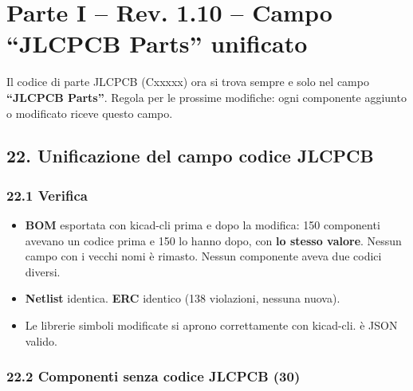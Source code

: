 \clearpage
\section[Parte I – Rev. 1.10 – Campo \textquotedblleft{}JLCPCB Parts\textquotedblright{} unificato]{Parte I – Rev. 1.10 – Campo \textquotedblleft{}JLCPCB Parts\textquotedblright{} unificato}

Il codice di parte JLCPCB (Cxxxxx) ora si trova sempre e solo nel campo \textbf{\textquotedblleft{}JLCPCB Parts\textquotedblright{}}. Regola per le prossime modifiche: ogni componente aggiunto o modificato riceve questo campo.

\subsection[22. Unificazione del campo codice JLCPCB]{22. Unificazione del campo codice JLCPCB }

\subsubsection[22.1 Verifica]{22.1 Verifica}

\begin{itemize}
\item \textbf{BOM} esportata con kicad-cli prima e dopo la modifica: 150 componenti avevano un codice prima e 150 lo hanno dopo, con \textbf{lo stesso valore}. Nessun campo con i vecchi nomi è rimasto. Nessun componente aveva due codici diversi.
\item \textbf{Netlist} identica. \textbf{ERC} identico (138 violazioni, nessuna nuova).
\item Le librerie simboli modificate si aprono correttamente con kicad-cli.  è JSON valido.
\end{itemize}

\subsubsection[22.2 Componenti senza codice JLCPCB (30)]{22.2 Componenti senza codice JLCPCB (30)}

